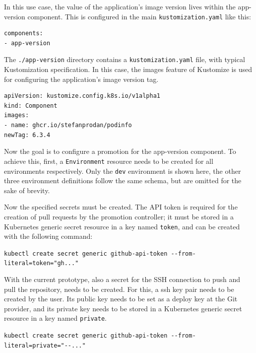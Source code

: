 In this use case, the value of the application's image version lives within the 
app-version component. This is configured in the main \lstinline|kustomization.yaml|
like this:

\begin{lstlisting}
components:
- app-version
\end{lstlisting}

The \lstinline|./app-version| directory contains a \lstinline|kustomization.yaml| file,
with typical Kustomization specification.
In this case, the images feature of Kustomize is used for configuring the application's
image version tag.

\begin{lstlisting}
apiVersion: kustomize.config.k8s.io/v1alpha1
kind: Component
images:
- name: ghcr.io/stefanprodan/podinfo
newTag: 6.3.4
\end{lstlisting}

Now the goal is to configure a promotion for the app-version component.
To achieve this, 
first, a \lstinline|Environment| resource needs to be created
for all environments respectively.
Only the \lstinline|dev| environment is shown here,
the other three environment definitions follow the same schema,
but are omitted for the sake of brevity.



%
%
%
%
%

Now the specified secrets must be created.
The API token is required for the creation of pull requests by the promotion controller;
it must be stored in a Kubernetes generic secret resource in a key named \lstinline|token|,
and can be created with the following command:

\lstinline|kubectl create secret generic github-api-token --from-literal=token="gh..."|

With the current prototype, also a secret for the SSH connection to push and pull
the repository, needs to be created.
For this, a ssh key pair needs to be created by the user. Its public key needs to 
be set as a deploy key at the Git provider,
and its private key needs to be stored in a
Kubernetes generic secret resource in a key named \lstinline|private|.

\lstinline|kubectl create secret generic github-api-token --from-literal=private="--..."|

